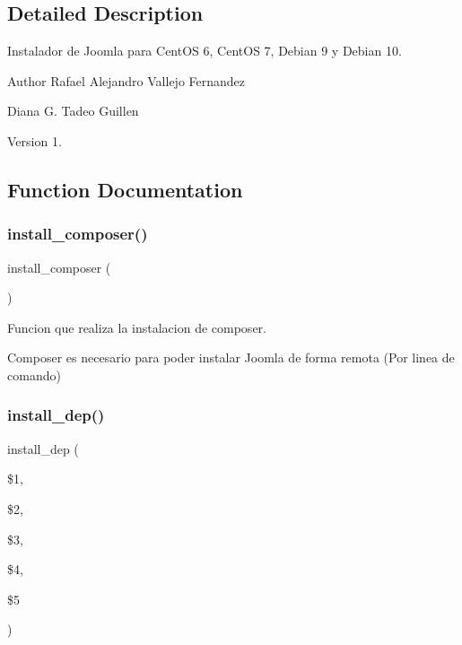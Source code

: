 \subsection{Detailed Description}
Instalador de Joomla para Cent\+OS 6, Cent\+OS 7, Debian 9 y Debian 10. 

\begin{DoxyAuthor}{Author}
Rafael Alejandro Vallejo Fernandez 

Diana G. Tadeo Guillen 
\end{DoxyAuthor}
\begin{DoxyVersion}{Version}
1. 
\end{DoxyVersion}


\subsection{Function Documentation}
\mbox{\label{Joomla__Instalador__General_8sh_a9cbb91389a71b89c6cab0848d688e423}} 
\subsubsection{\texorpdfstring{install\+\_\+composer()}{install\_composer()}}
{\footnotesize\ttfamily install\+\_\+composer (\begin{DoxyParamCaption}{ }\end{DoxyParamCaption})}



Funcion que realiza la instalacion de composer. 

Composer es necesario para poder instalar Joomla de forma remota (Por linea de comando) \mbox{\label{Joomla__Instalador__General_8sh_a867cb91b69b68d903ea8d2ebcff6ea36}} 
\subsubsection{\texorpdfstring{install\+\_\+dep()}{install\_dep()}}
{\footnotesize\ttfamily install\+\_\+dep (\begin{DoxyParamCaption}\item[{}]{\$1,  }\item[{}]{\$2,  }\item[{}]{\$3,  }\item[{}]{\$4,  }\item[{}]{\$5 }\end{DoxyParamCaption})}



